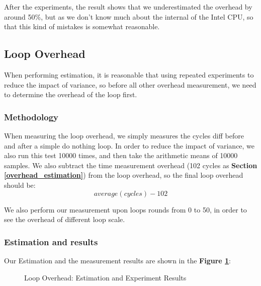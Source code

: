 After the experiments, the result shows that we underestimated the overhead by around 50\%, but as we don't know much about the internal of the Intel CPU, so that this kind of mistakes is somewhat reasonable.

\subsection{Loop Overhead}
When performing estimation, it is reasonable that using repeated experiments to reduce the impact of variance, so before all other overhead measurement, we need to determine the overhead of the loop first.

\subsubsection{Methodology}

When measuring the loop overhead, we simply measures the cycles diff before and after a simple do nothing loop. In order to reduce the impact of variance, we also run this test 10000 times, and then take the arithmetic
means of 10000 samples. We also subtract the time measurement overhead (102 cycles as \textbf{Section \ref{overhead_estimation}}) from the loop overhead, so the final loop overhead should be:
    $$ average(cycles) - 102 $$

We also perform our measurement upon loops rounds from 0 to 50, in order to see the overhead of different loop scale.

\subsubsection{Estimation and results}

Our Estimation and the measurement results are shown in the \textbf{Figure \ref{loop_overhead_result}}:

\begin{figure}[ht]
    \centering
    \caption{Loop Overhead: Estimation and Experiment Results }
    \label{loop_overhead_result}
\end{figure}

